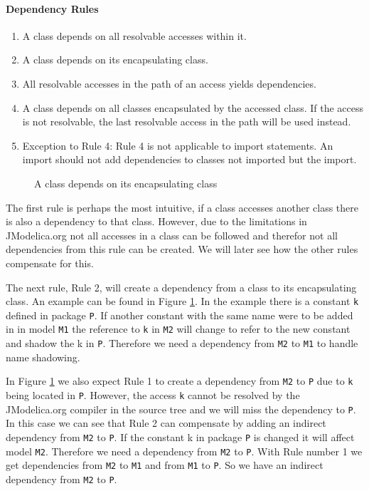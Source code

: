 \documentclass{cslthse-msc}
\begin{document}
\paragraph{Dependency Rules}
\begin{enumerate}
\item A class depends on all resolvable accesses within it.
\item A class depends on its encapsulating class. 
\item All resolvable accesses in the path of an access yields dependencies.
\item A class depends on all classes encapsulated by the accessed class. If the access is not resolvable, the last resolvable access in the path will be used instead.
\item Exception to Rule 4: Rule 4 is not applicable to import statements. An import should not add dependencies to classes not imported but the import.
\end{enumerate}


\begin{figure}[!htbp]
    \centering
    \qquad
    \subfloat{\raisebox{3.2 cm}{}}
    \caption{A class depends on its encapsulating class}
    \label{fig:parentGraph}
\end{figure}

The first rule is perhaps the most intuitive, if a class accesses another class there is also a dependency to that class. However, due to the limitations in JModelica.org not all accesses in a class can be followed and therefor not all dependencies from this rule can be created. We will later see how the other rules compensate for this. 

The next rule, Rule 2, will create a dependency from a class to its encapsulating class. An example can be found in Figure \ref{fig:parentGraph}. In the example there is a constant \texttt{k} defined in package \texttt{P}. If another constant with the same name were to be added in in model \texttt{M1} the reference to \texttt{k} in \texttt{M2} will change to refer to the new constant and shadow the k in \texttt{P}. Therefore we need a dependency from \texttt{M2} to \texttt{M1} to handle name shadowing.

In Figure \ref{fig:parentGraph} we also expect Rule 1 to create a dependency from \texttt{M2} to \texttt{P} due to \texttt{k} being located in \texttt{P}. However, the access \texttt{k} cannot be resolved by the JModelica.org compiler in the source tree and we will miss the dependency to \texttt{P}. In this case we can see that Rule 2 can compensate by adding an indirect dependency from \texttt{M2} to \texttt{P}. 
If the constant k in package \texttt{P} is changed it will affect model \texttt{M2}. Therefore we need a dependency from \texttt{M2} to \texttt{P}. With Rule number 1 we get dependencies from \texttt{M2} to \texttt{M1} and from \texttt{M1} to \texttt{P}. So we have an indirect dependency from \texttt{M2} to \texttt{P}.
\end{document}
